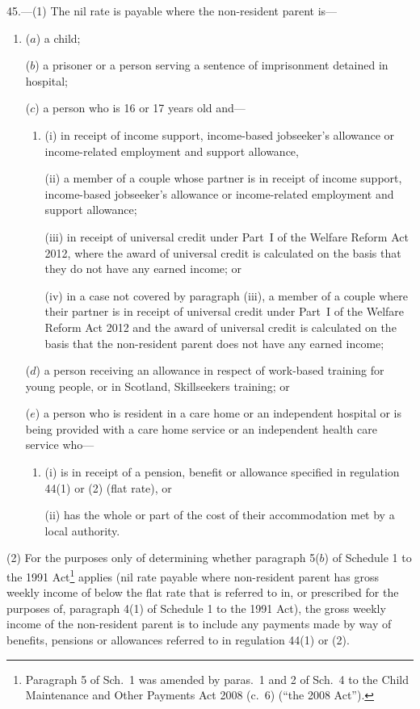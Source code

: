 \documentclass[12pt,a4paper]{article}
\begin{document}
45.---(1)  The nil rate is payable where the non-resident parent is—
\begin{enumerate}\item[]
($a$) a child;

($b$) a prisoner or a person serving a sentence of imprisonment detained in hospital;

($c$) a person who is 16 or 17 years old and—
\begin{enumerate}\item[]
(i) in receipt of income support, income-based jobseeker’s allowance or income-related employment and support allowance, 

(ii) a member of a couple whose partner is in receipt of income support, income-based jobseeker’s allowance or income-related employment and support allowance;

(iii) in receipt of universal credit under Part~I of the Welfare Reform Act 2012, where the award of universal credit is calculated on the basis that they do not have any earned income; or

(iv) in a case not covered by paragraph (iii), a member of a couple where their partner is in receipt of universal credit under Part~I of the Welfare Reform Act 2012 and the award of universal credit is calculated on the basis that the non-resident parent does not have any earned income;
\end{enumerate}

($d$) a person receiving an allowance in respect of work-based training for young people, or in Scotland, Skillseekers training; or

($e$) a person who is resident in a care home or an independent hospital or is being provided with a care home service or an independent health care service who—
\begin{enumerate}\item[]
(i) is in receipt of a pension, benefit or allowance specified in regulation 44(1) or (2) (flat rate), or

(ii) has the whole or part of the cost of their accommodation met by a local authority.
\end{enumerate}
\end{enumerate}

(2) For the purposes only of determining whether paragraph 5($b$)  of Schedule 1 to the 1991 Act\footnote{Paragraph 5 of Sch.~1 was amended by paras.~1 and 2 of Sch.~4 to the Child Maintenance and Other Payments Act 2008 (c.~6) (“the 2008 Act”).} applies (nil rate payable where non-resident parent has gross weekly income of below the flat rate that is referred to in, or prescribed for the purposes of, paragraph 4(1) of Schedule 1 to the 1991 Act), the gross weekly income of the non-resident parent is to include any payments made by way of benefits, pensions or allowances referred to in regulation 44(1) or (2).
\end{document}
